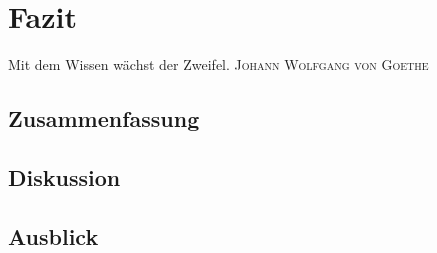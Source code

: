 
\chapter{Fazit} %

\label{Chapter8} %


\begin{itquote}
  Mit dem Wissen wächst der Zweifel.
  \flushright
  \textsc{Johann Wolfgang von Goethe}
\end{itquote}

\section{Zusammenfassung}

\section{Diskussion}

\section{Ausblick}
